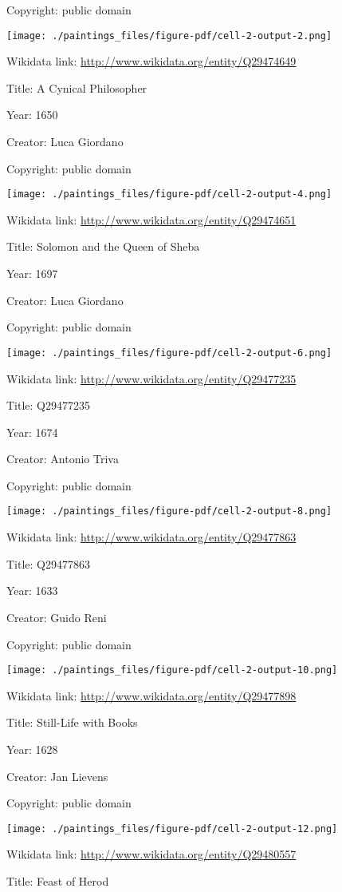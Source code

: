 \documentclass[
  letterpaper,
]{book}
\begin{document}
Copyright: public domain

\texttt{[image: ./paintings\_files/figure-pdf/cell-2-output-2.png]}

Wikidata link: \url{http://www.wikidata.org/entity/Q29474649}

Title: A Cynical Philosopher

Year: 1650

Creator: Luca Giordano

Copyright: public domain

\texttt{[image: ./paintings\_files/figure-pdf/cell-2-output-4.png]}

Wikidata link: \url{http://www.wikidata.org/entity/Q29474651}

Title: Solomon and the Queen of Sheba

Year: 1697

Creator: Luca Giordano

Copyright: public domain

\texttt{[image: ./paintings\_files/figure-pdf/cell-2-output-6.png]}

Wikidata link: \url{http://www.wikidata.org/entity/Q29477235}

Title: Q29477235

Year: 1674

Creator: Antonio Triva

Copyright: public domain

\texttt{[image: ./paintings\_files/figure-pdf/cell-2-output-8.png]}

Wikidata link: \url{http://www.wikidata.org/entity/Q29477863}

Title: Q29477863

Year: 1633

Creator: Guido Reni

Copyright: public domain

\texttt{[image: ./paintings\_files/figure-pdf/cell-2-output-10.png]}

Wikidata link: \url{http://www.wikidata.org/entity/Q29477898}

Title: Still-Life with Books

Year: 1628

Creator: Jan Lievens

Copyright: public domain

\texttt{[image: ./paintings\_files/figure-pdf/cell-2-output-12.png]}

Wikidata link: \url{http://www.wikidata.org/entity/Q29480557}

Title: Feast of Herod
\end{document}
